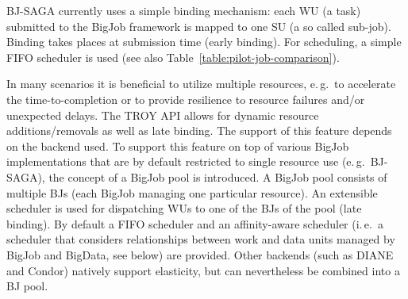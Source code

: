 \documentclass[conference,final]{IEEEtran}
\newcommand{\jhanote}[1]{ {\textcolor{red} { ***shantenu: #1 }}}
\newcommand{\alnote}[1]{ {\textcolor{blue} { ***andre: #1 }}}
\newcommand{\alnote}[1]{}
\newcommand{\jhanote}[1]{}
\begin{document}
BJ-SAGA currently uses a simple binding mechanism: each WU (a task)
submitted to the BigJob framework is mapped to one SU (a so called
sub-job).  Binding takes places at submission time (early binding).
For scheduling, a simple FIFO scheduler is used (see also
Table~\ref{table:pilot-job-comparison}).




In many scenarios it is beneficial to utilize multiple resources,
e.\,g.\ to accelerate the time-to-completion or to provide resilience
to resource failures and/or unexpected delays. The TROY API allows for
dynamic resource additions/removals as well as late binding. The
support of this feature depends on the backend used. To support this
feature on top of various BigJob implementations that are by default
restricted to single resource use (e.\,g.\ BJ-SAGA), the concept of a
BigJob pool is introduced. A BigJob pool consists of multiple BJs
(each BigJob managing one particular resource). An extensible
scheduler is used for dispatching WUs to one of the BJs of the pool
(late binding). By default a FIFO scheduler and an affinity-aware
scheduler (i.\,e.\ a scheduler that considers relationships between
work and data units managed by BigJob and BigData, see below) are
provided. Other backends (such as DIANE and Condor) natively support elasticity,
but can nevertheless be combined into a BJ pool.



\end{document}

